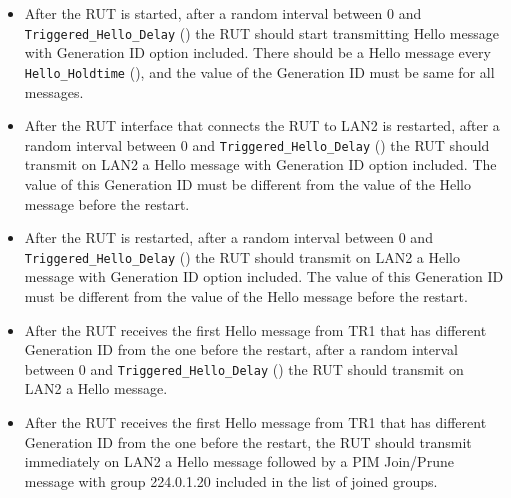 \documentclass[11pt]{report}
\begin{document}
\begin{itemize}

  \item After the RUT is started, after a random interval between
        0 and \verb=Triggered_Hello_Delay= ({\PimsmTriggeredHelloDelay}) the
        RUT should start transmitting Hello message with Generation ID
        option included. There should be a Hello message every
        \verb=Hello_Holdtime= ({\PimsmHelloHoldtime}), and the value of the
        Generation ID must be same for all messages.

  \item After the RUT interface that connects the RUT to LAN2 is restarted,
        after a random interval between 0 and \verb=Triggered_Hello_Delay=
        ({\PimsmTriggeredHelloDelay}) the RUT should transmit on LAN2 a Hello
        message with Generation ID option included. The value of this
        Generation ID must be different from the value of the Hello message
        before the restart.

  \item After the RUT is restarted,
        after a random interval between 0 and \verb=Triggered_Hello_Delay=
        ({\PimsmTriggeredHelloDelay}) the RUT should transmit on LAN2 a Hello
        message with Generation ID option included. The value of this
        Generation ID must be different from the value of the Hello message
        before the restart.
        
\end{itemize}


\begin{itemize}

  \item After the RUT receives the first Hello message from TR1 that
	has different Generation ID from the one before the restart,
        after a random interval between 0 and \verb=Triggered_Hello_Delay=
        ({\PimsmTriggeredHelloDelay}) the RUT should transmit on LAN2 a Hello
        message.

\end{itemize}


\begin{itemize}

  \item After the RUT receives the first Hello message from TR1 that
	has different Generation ID from the one before the restart,
	the RUT should transmit immediately on LAN2 a Hello message
	followed by a PIM Join/Prune message with group 224.0.1.20
	included in the list of joined groups.

\end{itemize}
\end{document}
